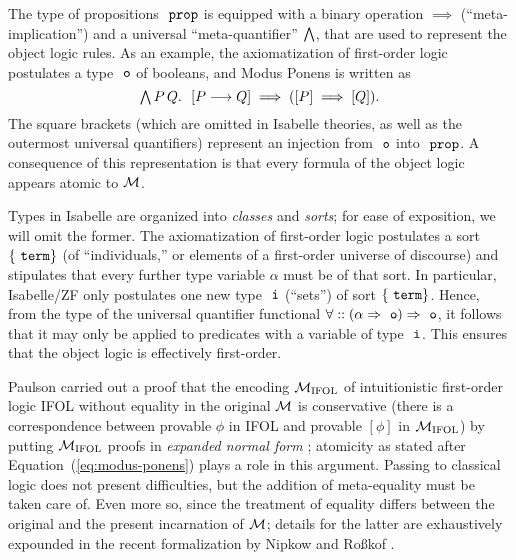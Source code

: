 The type of propositions $\prop$ is equipped with a binary operation
${\implies}$ (“meta-implication”) and a universal “meta-quantifier”
$\textstyle\bigwedge$, that are used to represent the object
logic rules. As an example, the axiomatization of first-order logic
postulates a type $\tyo$ of booleans, and Modus Ponens
is written as
\begin{equation}\label{eq:modus-ponens}
  \textstyle\bigwedge P\,Q.\ \ [P\longrightarrow Q] \implies ([P] \implies [Q]).
\end{equation}
The square brackets (which are omitted in Isabelle theories, as well
as the outermost universal quantifiers) represent
an injection from $\tyo$ into $\prop$. %
A consequence of this representation is that every formula of
the object logic appears atomic to $\mathcal{M}$.

Types in Isabelle are organized into \emph{classes} and \emph{sorts};
for ease of exposition, we will omit the former.  The axiomatization
of first-order logic postulates a sort $\{\type{term}\}$ (of
“individuals,” or elements of a first-order universe of discourse) and
stipulates that every further type variable $\alpha$ must be of that
sort. In particular, Isabelle/ZF only postulates one new type $\tyi$
(“sets”) of sort $\{\type{term}\}$. Hence, from the type of the universal
quantifier functional $\forall :: (\alpha \fun \tyo) \fun \tyo$, it
follows that it may only be applied to predicates with a variable of
type $\tyi$. This ensures that the object logic is effectively
first-order.

Paulson  \cite{Paulson1989} carried out a proof that the encoding
$\mathcal{M}_{\mathrm{IFOL}}$ of
intuitionistic first-order logic IFOL without equality  in the original $\mathcal{M}$ is
conservative (there is a correspondence between provable $\phi$ in
IFOL and provable $[\phi]$ in $\mathcal{M}_{\mathrm{IFOL}}$) by putting
$\mathcal{M}_{\mathrm{IFOL}}$ proofs in \emph{expanded normal form}
\cite{MR0387024}; atomicity as stated after
Equation~(\ref{eq:modus-ponens}) plays a role in this argument. Passing to classical logic does not present
difficulties, but the addition of meta-equality must be taken care of.
Even more so, since the treatment of equality differs between the
original and the present incarnation of $\mathcal{M}$; details for the
latter are exhaustively expounded in the recent formalization by
Nipkow and Roßkof \cite{10.1007/978-3-030-79876-5_6}.

